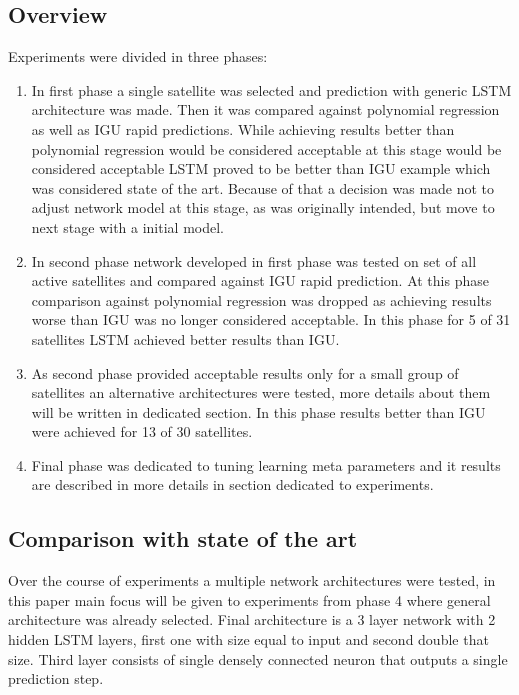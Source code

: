 \documentclass{kybernetika}
\begin{document}
\subsection{Overview}
Experiments were divided in three phases:
\begin{enumerate}
\item In first phase a single satellite was selected and prediction with generic LSTM architecture
	was made. Then it was compared against polynomial regression as well as IGU rapid predictions.
	While achieving results better than polynomial regression would be considered acceptable at 
	this stage would be considered acceptable LSTM proved to be better than IGU example which
	was considered state of the art. Because of that a decision was made not to adjust network
	model at this stage, as was originally intended, but move to next stage with a initial model.

\item In second phase network developed in first phase was tested on set of all active 
	satellites and compared against IGU rapid prediction. At this phase comparison against 
	polynomial regression was dropped as achieving results worse than IGU was no longer 
	considered acceptable. In this phase for 5 of 31 satellites LSTM achieved better 
	results than IGU.

\item As second phase provided acceptable results only for a small group of satellites 
	an alternative architectures were tested, more details about them will be written in 
	dedicated section. In this phase results better than IGU were achieved 
	for 13 of 30 satellites.
\item Final phase was dedicated to tuning learning meta parameters and it results are described
	in more details in section dedicated to experiments.

\end{enumerate}

\subsection{Comparison with state of the art}
Over the course of experiments a multiple network architectures were tested, in this paper
main focus will be given to experiments from phase 4 where general architecture was already
selected.
Final architecture is a 3 layer network with 2 hidden LSTM layers, first one with size equal
to input and second double that size. Third layer consists of single densely connected neuron
that outputs a single prediction step.
\end{document}
